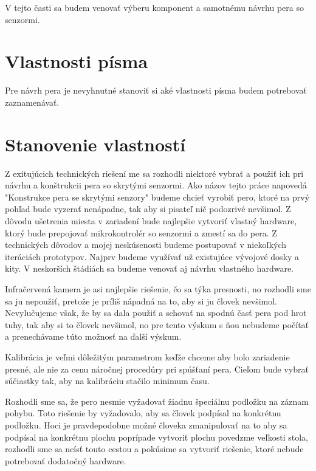 V tejto časti sa budem venovať výberu komponent a samotnému návrhu pera so senzormi.

\section{Vlastnosti písma}

Pre návrh pera je nevyhnutné stanoviť si aké vlastnosti písma budem potrebovať zaznamenávať. 

\section{Stanovenie vlastností}

Z exitujúcich technických riešení me sa rozhodli niektoré vybrať a použiť ich pri návrhu a konštrukcii pera so skrytými senzormi. Ako názov tejto práce napovedá "Konstrukce pera se skrytými senzory" budeme chcieť vyrobiť pero, ktoré na prvý pohľad bude vyzerať nenápadne, tak aby si pisateľ nič podozrivé nevšimol. Z dôvodu ušetrenia miesta v zariadení bude najlepšie vytvoriť vlastný hardware, ktorý bude prepojovať mikrokontrolér so senzormi a zmestí sa do pera. Z technických dôvodov a mojej neskúsenosti budeme postupovať v niekoľkých iteráciách prototypov. Najprv budeme využívať už existujúce vývojové dosky a kity. V neskorších štádiách sa budeme venovať aj návrhu vlastného hardware. 

Infračervená kamera je asi najlepšie riešenie, čo sa týka presnosti, no rozhodli sme sa ju nepoužiť, pretože je príliš nápadná na to, aby si ju človek nevšimol. Nevylučujeme však, že by sa dala použiť a schovať na spodnú časť pera pod hrot tuhy, tak aby si to človek nevšimol, no pre tento výskum s ňou nebudeme počítať a prenechávame túto možnosť na ďalší výskum.

Kalibrácia je veľmi dôležitým parametrom keďže chceme aby bolo zariadenie presné, ale nie za cenu náročnej procedúry pri spúšťaní pera. Cieľom bude vybrať súčiastky tak, aby na kalibráciu stačilo minimum času. 

Rozhodli sme sa, že pero nesmie vyžadovať žiadnu špeciálnu podložku na záznam pohybu. Toto riešenie by vyžadovalo, aby sa človek podpísal na konkrétnu podložku. Hoci je pravdepodobne možné človeka zmanipulovať na to aby sa podpísal na konkrétnu plochu poprípade vytvoriť plochu povedzme veľkosti stola, rozhodli sme sa neísť touto cestou a pokúsime sa vytvoriť riešenie, ktoré nebude potrebovať dodatočný hardware. \newline

